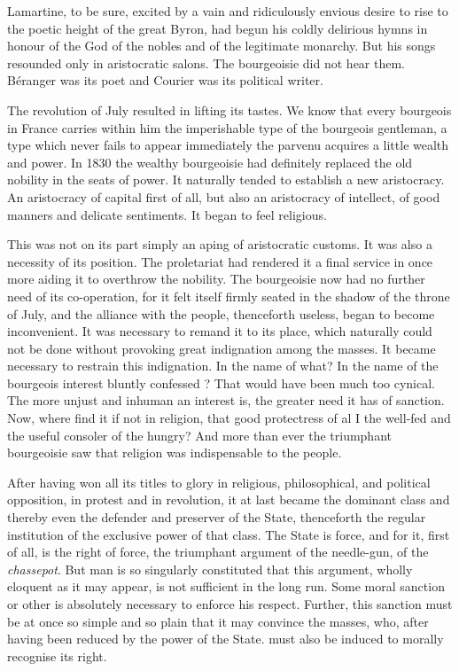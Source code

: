 \documentclass[12pt]{report}
\begin{document}
Lamartine, to be sure, excited by a vain and ridiculously envious desire to rise to the poetic height of the great Byron, had begun his coldly delirious hymns in honour of the God of the nobles and of the legitimate monarchy. But his songs resounded only in aristocratic salons. The bourgeoisie did not hear them. Béranger was its poet and Courier was its political writer.


The revolution of July resulted in lifting its tastes. We know that every bourgeois in France carries within him the imperishable type of the bourgeois gentleman, a type which never fails to appear immediately the parvenu acquires a little wealth and power. In 1830 the wealthy bourgeoisie had definitely replaced the old nobility in the seats of power. It naturally tended to establish a new aristocracy. An aristocracy of capital first of all, but also an aristocracy of intellect, of good manners and delicate sentiments. It began to feel religious.


This was not on its part simply an aping of aristocratic customs. It was also a necessity of its position. The proletariat had rendered it a final service in once more aiding it to overthrow the nobility. The bourgeoisie now had no further need of its co-operation, for it felt itself firmly seated in the shadow of the throne of July, and the alliance with the people, thenceforth useless, began to become inconvenient. It was necessary to remand it to its place, which naturally could not be done without provoking great indignation among the masses. It became necessary to restrain this indignation. In the name of what? In the name of the bourgeois interest bluntly confessed ? That would have been much too cynical. The more unjust and inhuman an interest is, the greater need it has of sanction. Now, where find it if not in religion, that good protectress of al I the well-fed and the useful consoler of the hungry? And more than ever the triumphant bourgeoisie saw that religion was indispensable to the people.


After having won all its titles to glory in religious, philosophical, and political opposition, in protest and in revolution, it at last became the dominant class and thereby even the defender and preserver of the State, thenceforth the regular institution of the exclusive power of that class. The State is force, and for it, first of all, is the right of force, the triumphant argument of the needle-gun, of the \emph{chassepot}. But man is so singularly constituted that this argument, wholly eloquent as it may appear, is not sufficient in the long run. Some moral sanction or other is absolutely necessary to enforce his respect. Further, this sanction must be at once so simple and so plain that it may convince the masses, who, after having been reduced by the power of the State. must also be induced to morally recognise its right.
\end{document}
